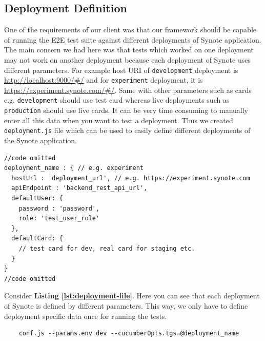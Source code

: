 \subsection{Deployment Definition}
\label{subsec:deployment-definition}
One of the requirements of our client was that our framework should be capable of running the E2E test suite against different deployments of Synote application. The main concern we had here was that tests which worked on one deployment may not work on another deployment because each deployment of Synote uses different parameters. For example host URI of \texttt{development} deployment is \url{http://localhost:9000/\#/} and for  \texttt{experiment} deployment, it is \url{https://experiment.synote.com/\#/}. Same with other parameters such as cards e.g. \texttt{development} should use test card whereas live deployments such as \texttt{production} should use live cards. It can be very time consuming to manually enter all this data when you want to test a deployment. Thus we created \texttt{deployment.js} file which can be used to easily define different deployments of the Synote application.

\begin{listing}[H]
\begin{verbatim}
//code omitted
deployment_name : { // e.g. experiment
  hostUrl : 'deployment_url', // e.g. https://experiment.synote.com
  apiEndpoint : 'backend_rest_api_url',
  defaultUser: {
    password : 'password',
    role: 'test_user_role'
  },
  defaultCard: {
    // test card for dev, real card for staging etc.
  }
}
//code omitted
\end{verbatim}
\label{lst:deployment-file}
\end{listing}

Consider \textbf{Listing \ref{lst:deployment-file}}. Here you can see that each deployment of Synote is defined by different parameters. This way, we only have to define deployment specific data once for running the tests.

\begin{listing}[H]
\begin{verbatim}
	conf.js --params.env dev --cucumberOpts.tgs=@deployment_name
\end{verbatim}
\label{lst:specifying-deployment-test-run}
\end{listing}

